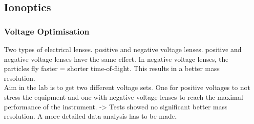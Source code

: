 	
	
	
	\subsection{Ionoptics}
	\subsubsection{Voltage Optimisation}
	Two types of electrical lenses. positive and negative voltage lenses. positive and negative voltage lenses have the same effect. In negative voltage lenses, the particles fly faster = shorter time-of-flight. This results in a better mass resolution.\\
	Aim in the lab is to get two different voltage sets. One for positive voltages to not stress the equipment and one with negative voltage lenses to reach the maximal performance of the instrument. -> Tests showed no significant better mass resolution. A more detailed data analysis has to be made. %
	
